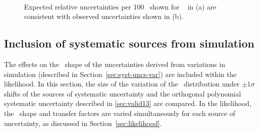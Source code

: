 \begin{figure}[h!]
  \centering
  ~~
  \\
  \caption{\label{fig:expectedObservedZinv}Expected relative uncertainties per 100 \GeV~shown for \zInv~ in (a) are consistent
  with observed uncertainties shown in (b).}
\end{figure}



\newpage
\subsection{Inclusion of systematic sources from simulation}
\label{sec:mcSystStudiesShape}

The effects on the \mht~shape of the uncertainties derived from variations in simulation 
(described in Section~\ref{sec:syst-uncs-var}) are included within the likelihood.
In this section, the size of the variation of the \mht~distribution under $\pm1\sigma$ shifts of the
sources of systematic uncertainty and the orthogonal polynomial systematic uncertainty
described in \ref{sec:valid13} are compared. In the likelihood, the \mht~shape and transfer factors
are varied simultaneously for each source of uncertainty, as discussed in Section~\ref{sec:likelihood}.

